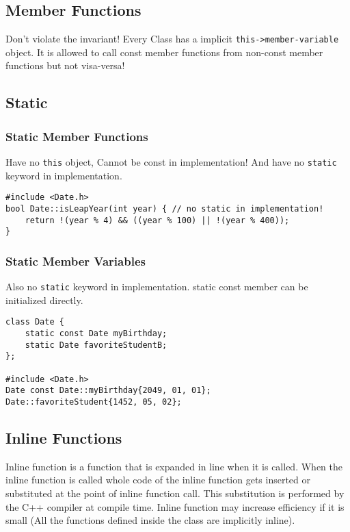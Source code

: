 \subsection{Member Functions}
Don't violate the invariant! Every Class has a implicit \lstinline|this->member-variable| object. It is allowed to call const member functions from non-const member functions but not visa-versa!

\subsection{Static}
\subsubsection{Static Member Functions}
Have no \lstinline|this| object, Cannot be const in implementation! And have no \lstinline|static| keyword in implementation.

\begin{lstlisting}
#include <Date.h>
bool Date::isLeapYear(int year) { // no static in implementation!
	return !(year % 4) && ((year % 100) || !(year % 400));
}
\end{lstlisting}

\subsubsection{Static Member Variables}
Also no \lstinline|static| keyword in implementation. static const member can be initialized directly.

\begin{lstlisting}
class Date {
	static const Date myBirthday;
	static Date favoriteStudentB;
};

#include <Date.h>
Date const Date::myBirthday{2049, 01, 01};
Date::favoriteStudent{1452, 05, 02};
\end{lstlisting}



\subsection{Inline Functions}
Inline function is a function that is expanded in line when it is called. When the inline function is called whole code of the inline function gets inserted or substituted at the point of inline function call. This substitution is performed by the C++ compiler at compile time. Inline function may increase efficiency if it is small (All the functions defined inside the class are implicitly inline).

